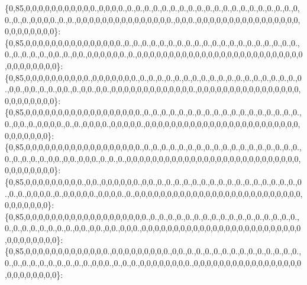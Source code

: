 \{0,85,0,0,0,0,0,0,0,0,0,0,0.,0,0,0,0.,0.,0.,0.,0.,0.,0.,0.,0.,0.,0.,0.,0.,0.,0.,0.,0.,0.,0.,0.,0,0.,0.,0.,0,0,0,0.,0.,0.,0,0,0,0,0,0,0,0,0,0,0,0,0,0,0.,0,0,0.,0,0,0,0,0,0,0,0,0,0,0,0,0,0,0,0,0,0,0,0,0,0,0,0\}\+: \{0,85,0,0,0,0,0,0,0,0,0,0,0,0,0,0,0.,0.,0.,0.,0.,0.,0.,0.,0.,0.,0.,0.,0.,0.,0.,0.,0.,0.,0.,0.,0.,0.,0.,0.,0.,0.,0,0.,0.,0,0.,0,0,0,0,0,0.,0.,0,0,0,0,0,0,0,0,0,0,0,0,0,0,0,0,0,0,0,0,0,0,0,0,0,0,0,0,0,0,0,0,0,0\}\+: \{0,85,0,0,0,0,0,0,0,0,0,0.,0,0,0,0,0,0,0.,0.,0.,0.,0.,0.,0.,0.,0.,0.,0.,0.,0.,0.,0.,0.,0.,0.,0.,0.,0,0.,0,0.,0.,0.,0,0.,0.,0,0.,0,0.,0,0,0,0,0,0,0,0,0,0,0,0,0.,0,0,0,0,0,0,0,0,0,0,0,0,0,0,0,0,0,0,0,0,0,0,0,0\}\+: \{0,85,0,0,0,0,0,0,0,0,0,0,0,0,0,0,0,0,0,0.,0.,0.,0.,0.,0.,0.,0.,0.,0.,0.,0.,0.,0.,0.,0.,0.,0.,0.,0.,0,0.,0.,0,0,0,0.,0.,0.,0,0,0,0.,0,0,0,0,0.,0,0,0,0,0,0,0,0,0,0,0,0,0,0,0,0,0,0,0,0,0,0,0,0,0,0,0,0,0,0,0\}\+: \{0,85,0,0,0,0,0,0,0,0,0,0,0,0,0,0,0,0,0,0.,0.,0.,0.,0.,0.,0.,0.,0.,0.,0.,0.,0.,0.,0.,0.,0.,0.,0.,0.,0.,0.,0.,0.,0,0.,0,0.,0,0,0.,0.,0.,0.,0,0,0,0,0,0,0,0,0,0,0,0,0,0,0,0,0,0,0,0,0,0,0,0,0,0,0,0,0,0,0,0,0,0,0\}\+: \{0,85,0,0,0,0,0,0,0,0,0.,0,0.,0,0,0,0,0,0.,0,0.,0.,0.,0.,0.,0.,0.,0.,0.,0.,0.,0.,0.,0.,0.,0.,0.,0.,0.,0.,0,0,0,0.,0.,0,0,0,0,0.,0,0,0,0.,0.,0,0,0,0,0,0,0,0,0,0,0,0,0,0,0,0,0,0,0,0,0,0,0,0,0,0,0,0,0,0,0,0,0\}\+: \{0,85,0,0,0,0,0,0,0,0,0,0,0,0,0,0,0,0,0,0,0.,0.,0.,0.,0.,0.,0.,0.,0.,0.,0.,0.,0.,0.,0.,0.,0.,0.,0.,0.,0.,0.,0.,0.,0.,0.,0,0.,0,0.,0,0.,0,0,0.,0,0,0,0,0,0,0,0,0,0,0,0,0,0,0,0,0,0,0,0,0,0,0,0,0,0,0,0,0,0,0,0,0\}\+: \{0,85,0,0,0,0,0,0,0,0,0,0,0,0,0.,0,0,0,0,0,0,0,0,0.,0,0.,0.,0.,0.,0.,0.,0.,0.,0.,0.,0.,0.,0.,0.,0.,0.,0.,0.,0.,0.,0.,0.,0.,0.,0,0,0.,0.,0.,0.,0,0,0,0,0,0,0,0.,0,0,0,0,0,0,0,0,0,0,0,0,0,0,0,0,0,0,0,0,0,0,0,0,0\}\+: 
